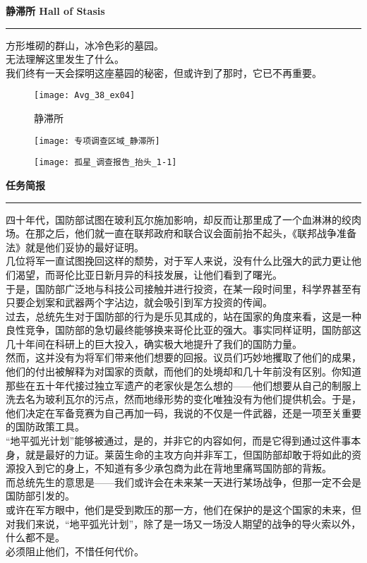 \documentclass[openany]{book}
\begin{document}
\textbf{静滞所 Hall of Stasis}\par\noindent\rule{\textwidth}{0.4pt}
方形堆砌的群山，冰冷色彩的墓园。\\
无法理解这里发生了什么。\\
我们终有一天会探明这座墓园的秘密，但或许到了那时，它已不再重要。\par
\begin{figure}[h]
    \caption*{静滞所}
    \centering
    \texttt{[image: Avg\_38\_ex04]}
\end{figure}
\begin{figure}[h]
    \centering
    \texttt{[image: 专项调查区域\_静滞所]}
\end{figure}
\clearpage

\begin{figure}[h]
    \centering
    \texttt{[image: 孤星\_调查报告\_抬头\_1-1]}
\end{figure}
{\Large\textbf{任务简报}}\par\noindent\rule{\textwidth}{0.4pt}
四十年代，国防部试图在玻利瓦尔施加影响，却反而让那里成了一个血淋淋的绞肉场。在那之后，他们就一直在联邦政府和联合议会面前抬不起头，《联邦战争准备法》就是他们妥协的最好证明。\\
几位将军一直试图挽回这样的颓势，对于军人来说，没有什么比强大的武力更让他们渴望，而哥伦比亚日新月异的科技发展，让他们看到了曙光。\\
于是，国防部广泛地与科技公司接触并进行投资，在某一段时间里，科学界甚至有只要企划案和武器两个字沾边，就会吸引到军方投资的传闻。\\
过去，总统先生对于国防部的行为是乐见其成的，站在国家的角度来看，这是一种良性竞争，国防部的急切最终能够换来哥伦比亚的强大。事实同样证明，国防部这几十年间在科研上的巨大投入，确实极大地提升了我们的国防力量。\\
然而，这并没有为将军们带来他们想要的回报。议员们巧妙地攫取了他们的成果，他们的付出被解释为对国家的贡献，而他们的处境却和几十年前没有区别。你知道那些在五十年代接过独立军遗产的老家伙是怎么想的——他们想要从自己的制服上洗去名为玻利瓦尔的污点，然而地缘形势的变化唯独没有为他们提供机会。于是，他们决定在军备竞赛为自己再加一码，我说的不仅是一件武器，还是一项至关重要的国防政策工具。\\
“地平弧光计划”能够被通过，是的，并非它的内容如何，而是它得到通过这件事本身，就是最好的力证。莱茵生命的主攻方向并非军工，但国防部却敢于将如此的资源投入到它的身上，不知道有多少承包商为此在背地里痛骂国防部的背叛。\\
而总统先生的意思是——我们或许会在未来某一天进行某场战争，但那一定不会是国防部引发的。\\
或许在军方眼中，他们是受到欺压的那一方，他们在保护的是这个国家的未来，但对我们来说，“地平弧光计划”，除了是一场又一场没人期望的战争的导火索以外，什么都不是。\\
必须阻止他们，不惜任何代价。
\clearpage
\end{document}
